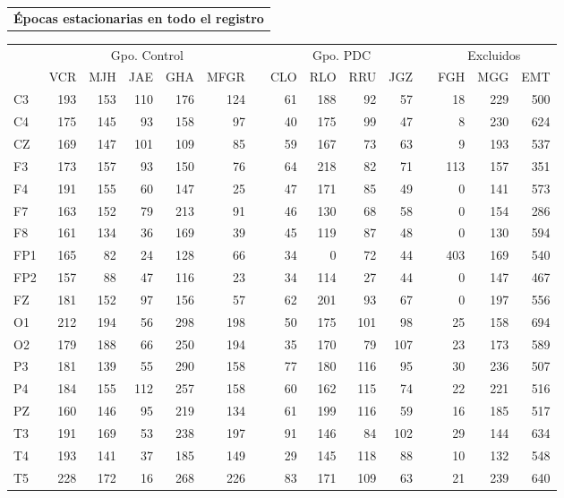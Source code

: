 \begin{SidewaysTable}
\centering
\begin{tabular}{c}
\textbf{Épocas estacionarias en todo el registro}
\vspace{1em}
\end{tabular}
\begin{tabular}{lrrrrrcrrrrcrrr}
\toprule
& \multicolumn{5}{c}{{Gpo. Control}} && 
  \multicolumn{4}{c}{{Gpo. PDC}} && 
  \multicolumn{3}{c}{{Excluidos}}\\
\cmidrule{2-6} \cmidrule{8-11} \cmidrule{13-15}
& {VCR} & {MJH} & {JAE} & {GHA} & {MFGR} & \phantom{l}
& {CLO} & {RLO} & {RRU} & {JGZ} & \phantom{l}
& {FGH} & {MGG} & {EMT} \\
\midrule
{C3} &193&153&110&176&124&&61 &188&92 &57 &&18&229&500 \\
{C4} &175&145&93 &158&97 &&40 &175&99 &47 &&8&230&624 \\
{CZ} &169&147&101&109&85 &&59 &167&73 &63 &&9&193&537 \\
\rowcolor{gris}
{F3} &173&157&93 &150&76 &&64 &218&82 &71 &&113&157&351 \\
\rowcolor{gris}
{F4} &191&155&60 &147&25 &&47 &171&85 &49 &&0&141&573 \\
\rowcolor{gris}
{F7} &163&152&79 &213&91 &&46 &130&68 &58 &&0&154&286 \\
\rowcolor{gris}
{F8} &161&134&36 &169&39 &&45 &119&87 &48 &&0&130&594 \\
{FP1}&165&82 &24 &128&66 &&34 &0  &72 &44 &&403&169&540 \\
{FP2}&157&88 &47 &116&23 &&34 &114&27 &44 &&0&147&467 \\
{FZ} &181&152&97 &156&57 &&62 &201&93 &67 &&0&197&556 \\
\rowcolor{gris}
{O1} &212&194&56 &298&198&&50 &175&101&98 &&25&158&694 \\
\rowcolor{gris}
{O2} &179&188&66 &250&194&&35 &170&79 &107&&23&173&589 \\
{P3} &181&139&55 &290&158&&77 &180&116&95 &&30&236&507 \\
{P4} &184&155&112&257&158&&60 &162&115&74 &&22&221&516 \\
{PZ} &160&146&95 &219&134&&61 &199&116&59 &&16&185&517 \\
\rowcolor{gris}
{T3} &191&169&53 &238&197&&91 &146&84 &102&&29&144&634 \\
\rowcolor{gris}
{T4} &193&141&37 &185&149&&29 &145&118&88 &&10&132&548 \\
\rowcolor{gris}
{T5} &228&172&16 &268&226&&83 &171&109&63 &&21&239&640 \\

\end{tabular}
\end{SidewaysTable}
